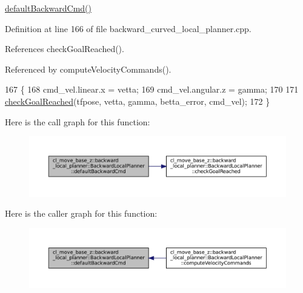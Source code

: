 \hyperlink{classcl__move__base__z_1_1backward__local__planner_1_1BackwardLocalPlanner_a1ebd69a028a22e3573e98f89d593f97d}{default\+Backward\+Cmd()} 

Definition at line 166 of file backward\+\_\+curved\+\_\+local\+\_\+planner.\+cpp.



References check\+Goal\+Reached().



Referenced by compute\+Velocity\+Commands().


\begin{DoxyCode}
167     \{
168         cmd\_vel.linear.x = vetta;
169         cmd\_vel.angular.z = gamma;
170 
171         \hyperlink{classcl__move__base__z_1_1backward__local__planner_1_1BackwardLocalPlanner_a6c4363e82119a6a8a5a3bfe309280898}{checkGoalReached}(tfpose, vetta, gamma, betta\_error, cmd\_vel);
172     \}
\end{DoxyCode}
Here is the call graph for this function\+:
\nopagebreak
\begin{figure}[H]
\begin{center}
\leavevmode
\includegraphics[width=350pt]{classcl__move__base__z_1_1backward__local__planner_1_1BackwardLocalPlanner_a1ebd69a028a22e3573e98f89d593f97d_cgraph}
\end{center}
\end{figure}
Here is the caller graph for this function\+:
\nopagebreak
\begin{figure}[H]
\begin{center}
\leavevmode
\includegraphics[width=350pt]{classcl__move__base__z_1_1backward__local__planner_1_1BackwardLocalPlanner_a1ebd69a028a22e3573e98f89d593f97d_icgraph}
\end{center}
\end{figure}
\mbox{\label{classcl__move__base__z_1_1backward__local__planner_1_1BackwardLocalPlanner_a9e8921ca8ce379ca8ba321f82ca23cdc}} 
